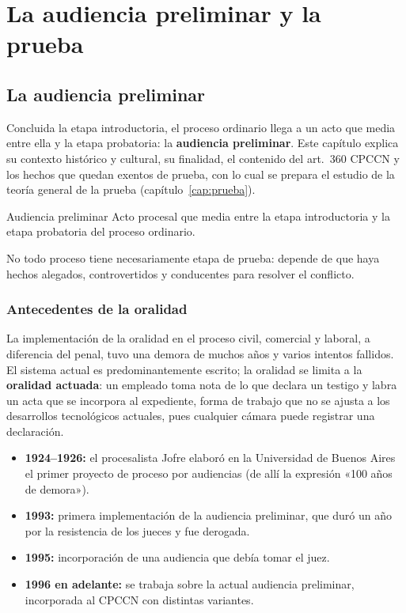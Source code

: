 \documentclass[12pt,oneside]{book}
\begin{document}
\part{La audiencia preliminar y la prueba}

\chapter{La audiencia preliminar}
\label{cap:audiencia}

Concluida la etapa introductoria, el proceso ordinario llega a un acto que media entre ella y la etapa probatoria: la \textbf{audiencia preliminar}. Este capítulo explica su contexto histórico y cultural, su finalidad, el contenido del art.~360 CPCCN y los hechos que quedan exentos de prueba, con lo cual se prepara el estudio de la teoría general de la prueba (capítulo~\ref{cap:prueba}).

\begin{definicion}{Audiencia preliminar}
Acto procesal que media entre la etapa introductoria y la etapa probatoria del proceso ordinario.
\end{definicion}

No todo proceso tiene necesariamente etapa de prueba: depende de que haya hechos alegados, controvertidos y conducentes para resolver el conflicto.

\section{Antecedentes de la oralidad}

La implementación de la oralidad en el proceso civil, comercial y laboral, a diferencia del penal, tuvo una demora de muchos años y varios intentos fallidos. El sistema actual es predominantemente escrito; la oralidad se limita a la \textbf{oralidad actuada}: un empleado toma nota de lo que declara un testigo y labra un acta que se incorpora al expediente, forma de trabajo que no se ajusta a los desarrollos tecnológicos actuales, pues cualquier cámara puede registrar una declaración.

\begin{itemize}
\item \textbf{1924--1926:} el procesalista Jofre elaboró en la Universidad de Buenos Aires el primer proyecto de proceso por audiencias (de allí la expresión «100 años de demora»).
\item \textbf{1993:} primera implementación de la audiencia preliminar, que duró un año por la resistencia de los jueces y fue derogada.
\item \textbf{1995:} incorporación de una audiencia que debía tomar el juez.
\item \textbf{1996 en adelante:} se trabaja sobre la actual audiencia preliminar, incorporada al CPCCN con distintas variantes. %
\end{itemize}
\end{document}

